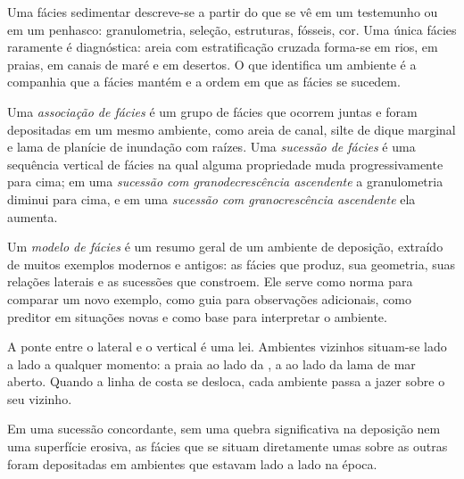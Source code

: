 Uma fácies sedimentar descreve-se a partir do que se vê em um testemunho ou em um
penhasco: granulometria, seleção, estruturas, fósseis, cor. Uma única fácies raramente é
diagnóstica: areia com estratificação cruzada forma-se em rios, em praias, em canais de maré e
em desertos. O que identifica um ambiente é a companhia que a fácies mantém e a ordem em que
as fácies se sucedem.

\begin{definition}\label{def:b3:facies-models:association}
Uma \emph{associação de fácies} é um grupo de fácies
que ocorrem juntas e foram depositadas em um mesmo ambiente, como areia de canal, silte de dique
marginal e lama de planície de inundação com raízes. Uma \emph{sucessão de
fácies} é uma sequência vertical de fácies na qual alguma propriedade
muda progressivamente para cima; em uma \emph{sucessão com granodecrescência
ascendente} a granulometria diminui para cima,
e em uma \emph{sucessão com granocrescência ascendente}
ela aumenta.
\end{definition}

\begin{definition}\label{def:b3:facies-models:model}
Um \emph{modelo de fácies} é um resumo geral de um
ambiente de deposição, extraído de muitos exemplos modernos e antigos: as fácies que produz,
sua geometria, suas relações laterais e as sucessões que constroem. Ele serve como norma
para comparar um novo exemplo, como guia para observações adicionais, como preditor em
situações novas e como base para
interpretar o ambiente.
\end{definition}

A ponte entre o lateral e o vertical é uma lei. Ambientes vizinhos situam-se lado a lado
a qualquer momento: a praia ao lado da , a  ao lado da lama de mar
aberto. Quando a linha de costa se desloca,
cada ambiente passa a jazer sobre o seu vizinho.

\begin{theorem}\label{thm:b3:facies-models:walther}
Em uma sucessão concordante, sem uma quebra significativa na deposição nem uma superfície erosiva,
as fácies que se situam diretamente umas sobre as outras foram depositadas
em ambientes que estavam lado a lado na época.
\end{theorem}

